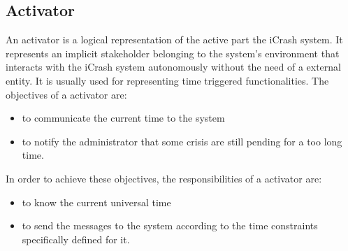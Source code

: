 \subsection{Activator}
An activator is a logical representation of the active part the iCrash system.
It represents an implicit stakeholder belonging to the system's environment that
interacts with the iCrash system autonomously without the need of a external
entity. It is usually used for representing time triggered functionalities. The
objectives of a activator are:
\begin{itemize}
\item to communicate the current time to the system
\item to notify the administrator that some crisis are still pending for a too
 long time.
\end{itemize}
In order to achieve these objectives, the responsibilities of a activator are:
\begin{itemize}
\item to know the current universal time
\item to send the messages to the system according to the time constraints
 specifically defined for it.
\end{itemize}
\newpage

